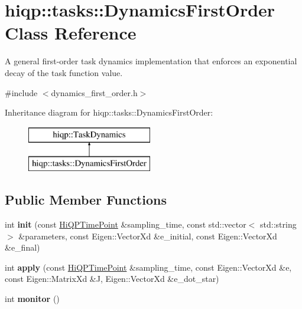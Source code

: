 \hypertarget{classhiqp_1_1tasks_1_1DynamicsFirstOrder}{\section{hiqp\-:\-:tasks\-:\-:Dynamics\-First\-Order Class Reference}
\label{classhiqp_1_1tasks_1_1DynamicsFirstOrder}
}


A general first-\/order task dynamics implementation that enforces an exponential decay of the task function value.  




{\ttfamily \#include $<$dynamics\-\_\-first\-\_\-order.\-h$>$}

Inheritance diagram for hiqp\-:\-:tasks\-:\-:Dynamics\-First\-Order\-:\begin{figure}[H]
\begin{center}
\leavevmode
\includegraphics[height=2.000000cm]{classhiqp_1_1tasks_1_1DynamicsFirstOrder}
\end{center}
\end{figure}
\subsection*{Public Member Functions}
\begin{DoxyCompactItemize}
\item 
\hypertarget{classhiqp_1_1tasks_1_1DynamicsFirstOrder_abc69e87ff78313a4cc7af891edea8a11}{int {\bfseries init} (const \hyperlink{classhiqp_1_1HiQPTimePoint}{Hi\-Q\-P\-Time\-Point} \&sampling\-\_\-time, const std\-::vector$<$ std\-::string $>$ \&parameters, const Eigen\-::\-Vector\-Xd \&e\-\_\-initial, const Eigen\-::\-Vector\-Xd \&e\-\_\-final)}\label{classhiqp_1_1tasks_1_1DynamicsFirstOrder_abc69e87ff78313a4cc7af891edea8a11}

\item 
\hypertarget{classhiqp_1_1tasks_1_1DynamicsFirstOrder_a56bf226ba8096f68a0d2dea9b41173ba}{int {\bfseries apply} (const \hyperlink{classhiqp_1_1HiQPTimePoint}{Hi\-Q\-P\-Time\-Point} \&sampling\-\_\-time, const Eigen\-::\-Vector\-Xd \&e, const Eigen\-::\-Matrix\-Xd \&J, Eigen\-::\-Vector\-Xd \&e\-\_\-dot\-\_\-star)}\label{classhiqp_1_1tasks_1_1DynamicsFirstOrder_a56bf226ba8096f68a0d2dea9b41173ba}

\item 
\hypertarget{classhiqp_1_1tasks_1_1DynamicsFirstOrder_af99445b8020b9e6cc37a24b226aa2d0d}{int {\bfseries monitor} ()}\label{classhiqp_1_1tasks_1_1DynamicsFirstOrder_af99445b8020b9e6cc37a24b226aa2d0d}

\end{DoxyCompactItemize}
